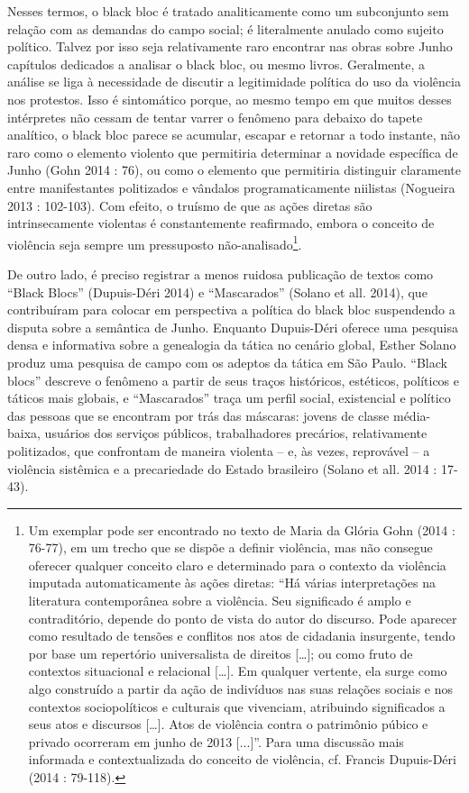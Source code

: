 Nesses termos, o black bloc é tratado
analiticamente como um subconjunto sem relação com as demandas do campo
social; é literalmente anulado como sujeito político. Talvez por isso
seja relativamente raro encontrar nas obras sobre Junho capítulos
dedicados a analisar o black bloc, ou mesmo livros. Geralmente, a
análise se liga à necessidade de discutir a legitimidade política do uso
da violência nos protestos. Isso é sintomático porque, ao mesmo tempo em
que muitos desses intérpretes não cessam de tentar varrer o fenômeno
para debaixo do tapete analítico, o black bloc parece se acumular,
escapar e retornar a todo instante, não raro como o elemento violento
que permitiria determinar a novidade específica de Junho (Gohn 2014 :
76), ou como o elemento que permitiria distinguir claramente entre
manifestantes politizados e vândalos programaticamente niilistas
(Nogueira 2013 : 102-103). Com efeito, o truísmo de que as ações diretas
são intrinsecamente violentas é constantemente reafirmado, embora o
conceito de violência seja sempre um pressuposto não-analisado\footnote{Um
  exemplar pode ser encontrado no texto de Maria da Glória Gohn (2014 :
  76-77), em um trecho que se dispõe a definir violência, mas não
  consegue oferecer qualquer conceito claro e determinado para o
  contexto da violência imputada automaticamente às ações diretas: ``Há
  várias interpretações na literatura contemporânea sobre a violência.
  Seu significado é amplo e contraditório, depende do ponto de vista do
  autor do discurso. Pode aparecer como resultado de tensões e conflitos
  nos atos de cidadania insurgente, tendo por base um repertório
  universalista de direitos {[}\ldots{}{]}; ou como fruto de contextos
  situacional e relacional {[}\ldots{}{]}. Em qualquer vertente, ela
  surge como algo construído a partir da ação de indivíduos nas suas
  relações sociais e nos contextos sociopolíticos e culturais que
  vivenciam, atribuindo significados a seus atos e discursos
  {[}\ldots{}{]}. Atos de violência contra o patrimônio púbico e privado
  ocorreram em junho de 2013 {[}...{]}''. Para uma discussão mais
  informada e contextualizada do conceito de violência, cf. Francis
  Dupuis-Déri (2014 : 79-118).}.

De outro lado, é preciso registrar a menos ruidosa publicação de textos
como ``Black Blocs'' (Dupuis-Déri 2014) e ``Mascarados'' (Solano et all.
2014), que contribuíram para colocar em perspectiva a política do black
bloc suspendendo a disputa sobre a semântica de Junho. Enquanto
Dupuis-Déri oferece uma pesquisa densa e informativa sobre a genealogia
da tática no cenário global, Esther Solano produz uma pesquisa de campo
com os adeptos da tática em São Paulo. ``Black blocs'' descreve o
fenômeno a partir de seus traços históricos, estéticos, políticos e
táticos mais globais, e ``Mascarados'' traça um perfil social,
existencial e político das pessoas que se encontram por trás das
máscaras: jovens de classe média-baixa, usuários dos serviços públicos,
trabalhadores precários, relativamente politizados, que confrontam de
maneira violenta -- e, às vezes, reprovável -- a violência sistêmica e a
precariedade do Estado brasileiro (Solano et all. 2014 : 17-43).

